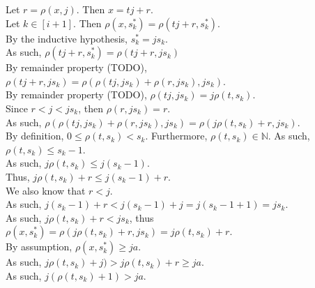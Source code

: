 \documentclass[a4paper,12pt]{article}
\begin{document}
\noindent Let $r = \rho(x, j)$. Then $x = tj + r$.\\

\noindent Let $k \in [i + 1]$. Then $\rho(x, s^*_k) = \rho(tj + r, s^*_k)$.\\

\noindent By the inductive hypothesis, $s^*_k = js_k$.\\

\noindent As such, $\rho(tj + r, s^*_k) = \rho(tj + r, js_k)$\\

\noindent By remainder property (TODO), $\rho(tj + r, js_k) = \rho(\rho(tj, js_k) + \rho(r, js_k), js_k)$.\\

\noindent By remainder property (TODO), $\rho(tj, js_k) = j \rho(t, s_k)$.\\

\noindent Since $r < j < js_k$, then $\rho(r, js_k) = r$.\\

\noindent As such, $\rho(\rho(tj, js_k) + \rho(r, js_k), js_k) = \rho(j \rho(t, s_k) + r, js_k)$.\\

\noindent By definition, $0 \leq \rho(t, s_k) < s_k$. Furthermore, $\rho(t, s_k) \in \mathbb{N}$. As such, $\rho(t, s_k) \leq s_k - 1$.\\

\noindent As such, $j \rho(t, s_k) \leq j(s_k - 1)$.\\

\noindent Thus, $j \rho(t, s_k) + r \leq j(s_k - 1) + r$.\\

\noindent We also know that $r < j$.\\

\noindent As such, $j(s_k - 1) + r < j(s_k - 1) + j = j(s_k - 1 + 1) = js_k$.\\

\noindent As such, $j \rho(t, s_k) + r < js_k$, thus $\rho(x, s^*_k) = \rho(j \rho(t, s_k) + r, js_k) = j \rho(t, s_k) + r$.\\

\noindent By assumption, $\rho(x, s^*_k) \geq ja$.\\

\noindent As such, $j \rho(t, s_k) + j) > j \rho(t, s_k) + r \geq ja$.\\

\noindent As such, $j(\rho(t, s_k) + 1) > ja$.\\
\end{document}
